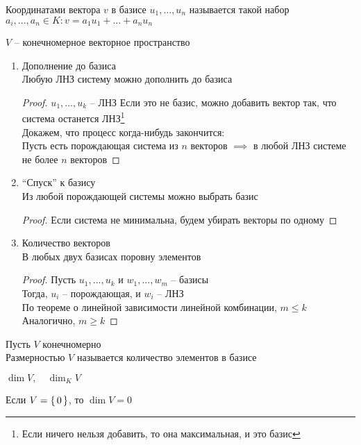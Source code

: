 \begin{definition}
	Координатами вектора $v$ в базисе $u_1, ..., u_n $ называется такой набор $ a_i, ..., a_n \in K : v = a_1u_1 + ... + a_nu_n $
\end{definition}

\begin{properties}[базиса]
	$ V $ -- конечномерное векторное пространство
    \begin{enumerate}
    	\item Дополнение до базиса \\
        Любую ЛНЗ систему можно дополнить до базиса
        \begin{proof}
            $ u_1, ..., u_k $ -- ЛНЗ
            Если это не базис, можно добавить вектор так, что система останется ЛНЗ\footnote{Если ничего нельзя добавить, то она максимальная, и это базис} \\
            Докажем, что процесс когда-нибудь закончится: \\
            Пусть есть порождающая система из $n$ векторов $ \implies $ в любой ЛНЗ системе не более $n$ векторов
        \end{proof}
        \item ``Спуск'' к базису \\
        Из любой порождающей системы можно выбрать базис
        \begin{proof}
        	Если система не минимальна, будем убирать векторы по одному
        \end{proof}
        \item Количество векторов \\
        В любых двух базисах поровну элементов
        \begin{proof}
            Пусть $ u_1, ..., u_k $ и $ w_1, ..., w_m $ -- базисы \\
            Тогда, $u_i$ -- порождающая, и $w_i$ -- ЛНЗ \\
            По теореме о линейной зависимости линейной комбинации, $m \le k $ \\
            Аналогично, $ m \ge k $
        \end{proof}
    \end{enumerate}
\end{properties}

\begin{definition}
	Пусть $V$ конечномерно \\
    Размерностью $V$ называется количество элементов в базисе
    \begin{notation}
        $ \dim V, \quad \dim_K V $
    \end{notation}
    Если $ V = \set{0} $, то $ \dim V = 0 $
\end{definition}

